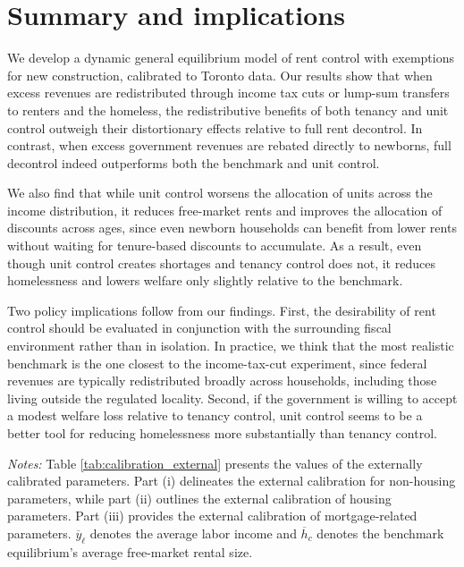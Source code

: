 \documentclass[parskip=full]{article}
\newenvironment{fignote2}[1]
{
\par
\medskip
\begin{minipage}{#1}
\footnotesize
}
{
\end{minipage}
}
\begin{document}
\section{Summary and implications}\label{sec:conclusion}

We develop a dynamic general equilibrium model of rent control with exemptions for new construction, calibrated to Toronto data. Our results show that when excess revenues are redistributed through income tax cuts or lump-sum transfers to renters and the homeless, the redistributive benefits of both tenancy and unit control outweigh their distortionary effects relative to full rent decontrol. In contrast, when excess government revenues are rebated directly to newborns, full decontrol indeed outperforms both the benchmark and unit control.

We also find that while unit control worsens the allocation of units across the income distribution, it reduces free-market rents and improves the allocation of discounts across ages, since even newborn households can benefit from lower rents without waiting for tenure-based discounts to accumulate. As a result, even though unit control creates shortages and tenancy control does not, it reduces homelessness and lowers welfare only slightly relative to the benchmark. 

Two policy implications follow from our findings. First, the desirability of rent control should be evaluated in conjunction with the surrounding fiscal environment rather than in isolation. In practice, we think that the most realistic benchmark is the one closest to the income-tax-cut experiment, since federal revenues are typically redistributed broadly across households, including those living outside the regulated locality. Second, if the government is willing to accept a modest welfare loss relative to tenancy control, unit control seems to be a better tool for reducing homelessness more substantially than tenancy control. 




\vspace{1cm}

\begin{table}[H]
    \centering
    \caption{Externally assigned parameter values}
    \vspace{-0.5cm}
    \label{tab:calibration_external}
    
    \vspace{-0.45cm}
    \begin{fignote2}{1.02\textwidth}
    \textit{Notes:} Table \ref{tab:calibration_external} presents the values of the externally calibrated parameters. Part (i) delineates the external calibration for non-housing parameters, while part (ii) outlines the external calibration of housing parameters. Part (iii) provides the external calibration of mortgage-related parameters. $\overline{y}_{\ell}$ denotes the average labor income and $\overline{h}_{c}$ denotes the benchmark equilibrium's average free-market rental size.
    \end{fignote2}
\end{table}
\end{document}
